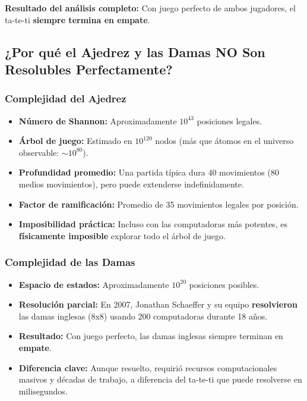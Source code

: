 \documentclass[12pt]{article}
\begin{document}
\textbf{Resultado del análisis completo:} Con juego perfecto de ambos jugadores, el ta-te-ti \textbf{siempre termina en empate}.

\subsection*{¿Por qué el Ajedrez y las Damas NO Son Resolubles Perfectamente?}

\subsubsection*{Complejidad del Ajedrez}

\begin{itemize}[leftmargin=2em]
    \item \textbf{Número de Shannon:} Aproximadamente $10^{43}$ posiciones legales.
    \item \textbf{Árbol de juego:} Estimado en $10^{120}$ nodos (más que átomos en el universo observable: $\sim 10^{80}$).
    \item \textbf{Profundidad promedio:} Una partida típica dura 40 movimientos (80 medios movimientos), pero puede extenderse indefinidamente.
    \item \textbf{Factor de ramificación:} Promedio de 35 movimientos legales por posición.
    \item \textbf{Imposibilidad práctica:} Incluso con las computadoras más potentes, es \textbf{físicamente imposible} explorar todo el árbol de juego.
\end{itemize}

\subsubsection*{Complejidad de las Damas}

\begin{itemize}[leftmargin=2em]
    \item \textbf{Espacio de estados:} Aproximadamente $10^{20}$ posiciones posibles.
    \item \textbf{Resolución parcial:} En 2007, Jonathan Schaeffer y su equipo \textbf{resolvieron} las damas inglesas (8x8) usando 200 computadoras durante 18 años.
    \item \textbf{Resultado:} Con juego perfecto, las damas inglesas siempre terminan en \textbf{empate}.
    \item \textbf{Diferencia clave:} Aunque resuelto, requirió recursos computacionales masivos y décadas de trabajo, a diferencia del ta-te-ti que puede resolverse en milisegundos.
\end{itemize}
\end{document}
